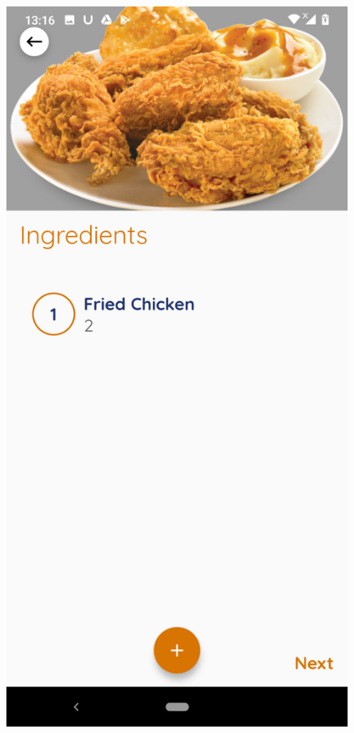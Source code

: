 \documentclass{article}
\begin{document}
\begin{figure}[h!]
        \includegraphics[scale=0.1]{Images/friechick_ingre.jpg}

\end{figure}
\end{document}

